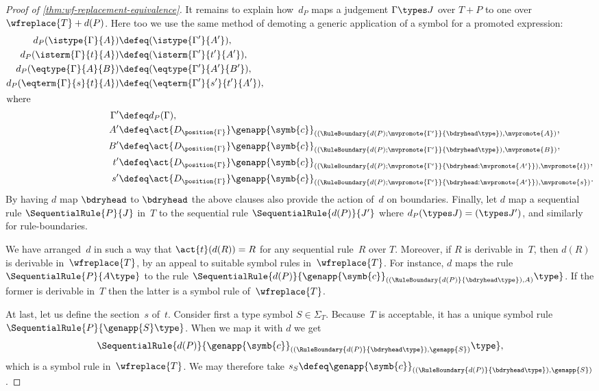 \begin{proof}[Proof of \cref{thm:wf-replacement-equivalence}]
  It remains to explain how~$d_P$ maps a judgement $\Gamma \types J$ over $T + P$ to one over $\wfreplace{T} + d(P)$. Here too we use the same method of demoting a generic application of a symbol for a promoted expression:
  \begin{align*}
    d_P (\istype{\Gamma}{A}) &\defeq (\istype{\Gamma'}{A'}),
    \\
    d_P (\isterm{\Gamma}{t}{A}) &\defeq (\isterm{\Gamma'}{t'}{A'}),
    \\
    d_P (\eqtype{\Gamma}{A}{B}) &\defeq (\eqtype{\Gamma'}{A'}{B'}),
    \\
    d_P (\eqterm{\Gamma}{s}{t}{A}) &\defeq (\eqterm{\Gamma'}{s'}{t'}{A'}),
    \\
    \shortintertext{where}
    \Gamma' &\defeq d_P(\Gamma), \\
    A' &\defeq \act{{D_{\position{\Gamma}}}}
          \genapp{\symb{c}}_{((\RuleBoundary{d(P); \mvpromote{\Gamma'}}{\bdryhead \type}), \mvpromote{A})},
    \\
    B' &\defeq \act{{D_{\position{\Gamma}}}}
          \genapp{\symb{c}}_{((\RuleBoundary{d(P); \mvpromote{\Gamma'}}{\bdryhead \type}), \mvpromote{B})},
    \\
    t' &\defeq \act{{D_{\position{\Gamma}}}}
          \genapp{\symb{c}}_{((\RuleBoundary{d(P); \mvpromote{\Gamma'}}{\bdryhead : \mvpromote{A'}}), \mvpromote{t})},
    \\
    s' &\defeq \act{{D_{\position{\Gamma}}}}
          \genapp{\symb{c}}_{((\RuleBoundary{d(P); \mvpromote{\Gamma'}}{\bdryhead : \mvpromote{A'}}), \mvpromote{s})}.
  \end{align*}
  By having $d$ map $\bdryhead$ to $\bdryhead$ the above clauses also provide the action of~$d$ on boundaries.
  Finally, let $d$ map a sequential rule $\SequentialRule{P}{J}$ in~$T$ to the sequential rule $\SequentialRule{d(P)}{J'}$ where
  $d_P(\types J) = (\types J')$, and similarly for rule-boundaries.

  We have arranged~$d$ in such a way that $\act{t} (d(R)) = R$ for any sequential rule~$R$ over $T$.
  Moreover, if $R$ is derivable in~$T$, then $d(R)$ is derivable in~$\wfreplace{T}$, by an appeal to suitable symbol rules in~$\wfreplace{T}$. For instance, $d$ maps the rule $\SequentialRule{P}{A \type}$ to the rule $\SequentialRule{d(P)}{\genapp{\symb{c}}_{((\RuleBoundary{d(P)}{\bdryhead \type}), A)} \type}$. If the former is derivable in~$T$ then the latter is a symbol rule of~$\wfreplace{T}$.

  At last, let us define the section~$s$ of~$t$. Consider first a type symbol $S \in \Sigma_T$. Because~$T$ is acceptable, it has a unique symbol rule $\SequentialRule{P}{\genapp{S} \type}$. When we map it with $d$ we get
  \begin{equation*}
    \SequentialRule{d(P)}{\genapp{\symb{c}}_{((\RuleBoundary{d(P)}{\bdryhead \type}), \genapp{S})} \type},
  \end{equation*}
  which is a symbol rule in~$\wfreplace{T}$. We may therefore take $s_S \defeq \genapp{\symb{c}}_{((\RuleBoundary{d(P)}{\bdryhead \type}), \genapp{S})}$.


\end{proof}
